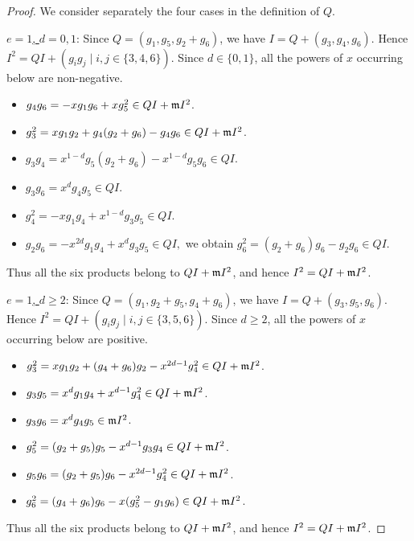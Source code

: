 \begin{proof}
	We consider separately the four cases in the definition of $Q$.
	
	\medskip
	
	\noindent
	\underline{$e=1$, $d =0, 1$}: Since $Q=(g_1, g_5, g_2+g_6)$, we have $I=Q+ (g_3, g_4, g_6)$.
	Hence $I^2=QI + (g_ig_j \mid i,j \in \{3,4,6\})$.
	Since $d\in\{0,1\}$, all the powers of $x$ occurring below are non-negative.
	\begin{itemize}
		\item $g_4g_6=-xg_1g_6+xg_5^2\in QI+\mathfrak m I^2$.
		\item $g_3^2=xg_1g_2+g_4(g_2+g_6)-g_4g_6\in QI+\mathfrak m I^2$.
		\item $
		 g_3g_4=x^{1-d}g_5(g_2+g_6)-x^{1-d}g_5g_6\in QI.
		$
		\item $
		 g_3g_6=x^dg_4g_5\in QI.
		$
		\item $
		 g_4^2=-xg_1g_4+x^{1-d}g_3g_5\in QI.
		$
		\item $
		 g_2g_6=-x^{2d}g_1g_4+x^dg_3g_5\in QI,
		$
		we obtain
		$
		 g_6^2=(g_2+g_6)g_6-g_2g_6\in QI.
		$
	\end{itemize}
	Thus all the six products belong to $QI+\mathfrak m I^2$, and hence
	$I^2=QI+\mathfrak m I^2$.

	\medskip
	
	\noindent
	\underline{$e=1$, $d\geq2$}: Since $Q=(g_1,g_2+g_5,g_4+g_6)$, we have $I=Q+(g_3,g_5,g_6)$.
	Hence $I^2=QI+(g_ig_j\mid i,j\in\{3,5,6\})$.
	Since $d\geq2$, all the powers of $x$ occurring below are positive.
	\begin{itemize}
		\item $g_3^2=xg_1g_2+(g_4+g_6)g_2-x^{2d-1}g_4^2\in QI+\mathfrak m I^2$.
		\item $g_3g_5=x^dg_1g_4+x^{d-1}g_4^2\in QI+\mathfrak m I^2$.
		\item $g_3g_6=x^dg_4g_5\in\mathfrak m I^2$.
		\item $g_5^2=(g_2+g_5)g_5-x^{d-1}g_3g_4\in QI+\mathfrak m I^2$.
		\item $g_5g_6=(g_2+g_5)g_6-x^{2d-1}g_4^2\in QI+\mathfrak m I^2$.
		\item $g_6^2=(g_4+g_6)g_6-x(g_5^2-g_1g_6)\in QI+\mathfrak m I^2$.
	\end{itemize}
	Thus all the six products belong to $QI+\mathfrak m I^2$, and hence
	$I^2=QI+\mathfrak m I^2$.

	\medskip
	

\end{proof}
